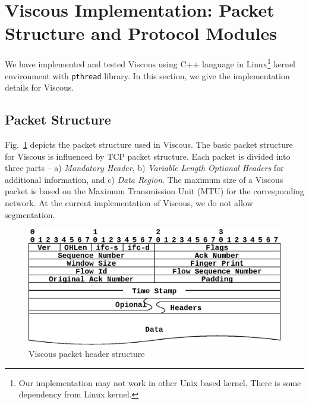 \section{Viscous Implementation: Packet Structure and Protocol Modules}
We have implemented and tested Viscous using C++ language in Linux\footnote{Our implementation may not work in other Unix based kernel. There is some dependency from Linux kernel.} kernel environment with \texttt{pthread} library. 
In this section, we give the implementation details for Viscous. 

\subsection{Packet Structure}
Fig.~\ref{fig:packet_format} depicts the packet structure used in Viscous. The basic packet structure for Viscous is influenced by TCP packet structure. Each packet is divided into three parts -- a) {\em Mandatory Header}, b) {\em Variable Length Optional Headers} for additional information, and c) {\em Data Region}. The maximum size of a Viscous packet is based on the Maximum Transmission Unit (MTU) for the corresponding network. At the current implementation of Viscous, we do not allow segmentation. 

\begin{figure}[!ht]
    \centering
    \includegraphics[width=0.75\linewidth]{img/Packet_format.eps}
    \caption{Viscous packet header structure}
    \label{fig:packet_format}
\end{figure}

